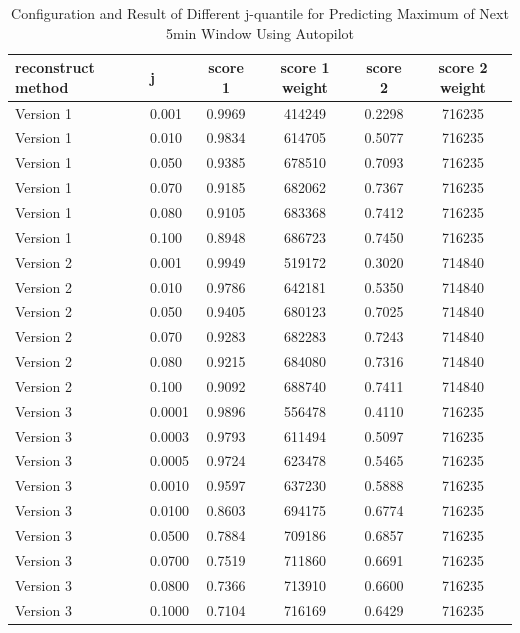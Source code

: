 \documentclass{article}
\begin{document}
\begin{table}[htbp]
  \begin{center}
    \caption{Configuration and Result of Different j-quantile for Predicting Maximum of Next 5min Window Using Autopilot}
    \label{tab:tab1.11.1}
    \begin{tabular}{l|l|*{4}{c}} \textbf{reconstruct method} & \textbf{j} &
      \textbf{score 1} & \textbf{score 1 weight} & \textbf{score 2} &
      \textbf{score 2 weight} \\
      \hline
      Version 1 & 0.001 & 0.9969 & 414249 & 0.2298 & 716235\\
      Version 1 & 0.010 & 0.9834 & 614705 & 0.5077 & 716235\\
      Version 1 & 0.050 & 0.9385 & 678510 & 0.7093 & 716235\\
      Version 1 & 0.070 & 0.9185 & 682062 & 0.7367 & 716235\\
      Version 1 & 0.080 & 0.9105 & 683368 & 0.7412 & 716235\\
      Version 1 & 0.100 & 0.8948 & 686723 & 0.7450 & 716235\\
      Version 2 & 0.001 & 0.9949 & 519172 & 0.3020 & 714840\\
      Version 2 & 0.010 & 0.9786 & 642181 & 0.5350 & 714840\\
      Version 2 & 0.050 & 0.9405 & 680123 & 0.7025 & 714840\\
      Version 2 & 0.070 & 0.9283 & 682283 & 0.7243 & 714840\\
      Version 2 & 0.080 & 0.9215 & 684080 & 0.7316 & 714840\\
      Version 2 & 0.100 & 0.9092 & 688740 & 0.7411 & 714840\\
      Version 3 & 0.0001 & 0.9896 & 556478 & 0.4110 & 716235\\
      Version 3 & 0.0003 & 0.9793 & 611494 & 0.5097 & 716235\\
      Version 3 & 0.0005 & 0.9724 & 623478 & 0.5465 & 716235\\
      Version 3 & 0.0010 & 0.9597 & 637230 & 0.5888 & 716235\\
      Version 3 & 0.0100 & 0.8603 & 694175 & 0.6774 & 716235\\
      Version 3 & 0.0500 & 0.7884 & 709186 & 0.6857 & 716235\\
      Version 3 & 0.0700 & 0.7519 & 711860 & 0.6691 & 716235\\
      Version 3 & 0.0800 & 0.7366 & 713910 & 0.6600 & 716235\\
      Version 3 & 0.1000 & 0.7104 & 716169 & 0.6429 & 716235\\
    \end{tabular}
  \end{center}
\end{table}
\end{document}
